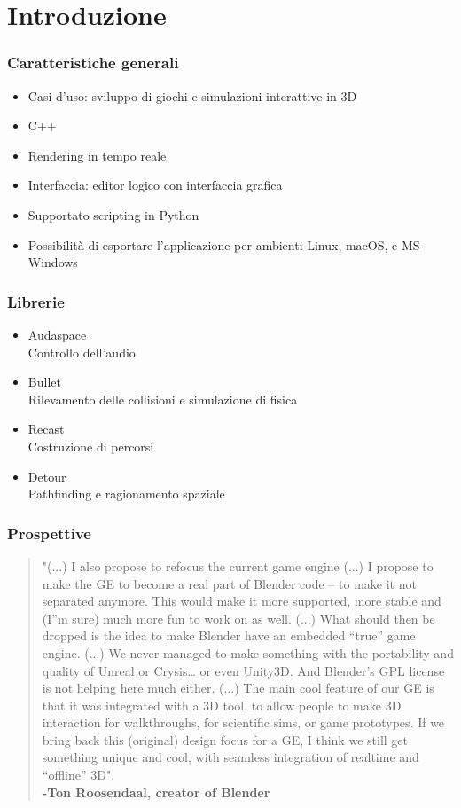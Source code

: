 \documentclass{beamer}
\begin{document}
	\section{Introduzione}
		\begin{frame}
			\frametitle{Caratteristiche generali}
			\begin{itemize}
				\item Casi d'uso: sviluppo di giochi e simulazioni interattive in 3D 
				\item C++
				\item Rendering in tempo reale
				\item Interfaccia: editor logico con interfaccia grafica 
				\item Supportato scripting in Python
				\item Possibilità di esportare l'applicazione per ambienti Linux, macOS, e MS-Windows
			\end{itemize}
		\end{frame}
		\begin{frame}
			\frametitle{Librerie}
			\begin{itemize}
				\item Audaspace \\ {\footnotesize\hspace{1em} Controllo dell'audio}
				\item Bullet \\ {\footnotesize\hspace{1em} Rilevamento delle collisioni e simulazione di fisica} 
				\item Recast \\ {\footnotesize\hspace{1em} Costruzione di percorsi}
				\item Detour \\ {\footnotesize\hspace{1em} Pathfinding e ragionamento spaziale}
			\end{itemize}
		\end{frame}
		\begin{frame}
			\frametitle{Prospettive}
			\begin{quotation}\small 
				"(...) I also propose to refocus the current game engine (...) I propose to make the GE to become a real part of Blender code – to make it not separated anymore. This would make it more supported, more stable and (I”m sure) much more fun to work on as well. (...) What should then be dropped is the idea to make Blender have an embedded “true” game engine. (...) We never managed to make something with the portability and quality of Unreal or Crysis… or even Unity3D. And Blender's GPL license is not helping here much either. (...) The main cool feature of our GE is that it was integrated with a 3D tool, to allow people to make 3D interaction for walkthroughs, for scientific sims, or game prototypes. If we bring back this (original) design focus for a GE, I think we still get something unique and cool, with seamless integration of realtime and “offline” 3D". 
				\\ \textcolor{BlenderOrange}{\textbf{-Ton Roosendaal, creator of Blender}} 
			\end{quotation} 
		\end{frame}
\end{document}
